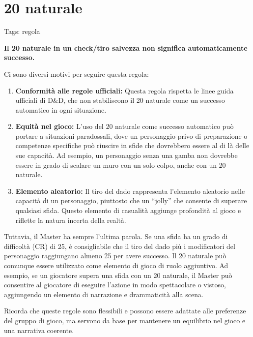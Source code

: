 \section{20 naturale}\label{naturale}

Tags: regola

\textbf{Il 20 naturale in un check/tiro salvezza non significa
automaticamente successo.}

Ci sono diversi motivi per seguire questa regola:

\begin{enumerate}
\def\labelenumi{\arabic{enumi}.}
\tightlist
\item
  \textbf{Conformità alle regole ufficiali:} Questa regola rispetta le
  linee guida ufficiali di D\&D, che non stabiliscono il 20 naturale
  come un successo automatico in ogni situazione.
\item
  \textbf{Equità nel gioco:} L'uso del 20 naturale come successo
  automatico può portare a situazioni paradossali, dove un personaggio
  privo di preparazione o competenze specifiche può riuscire in sfide
  che dovrebbero essere al di là delle sue capacità. Ad esempio, un
  personaggio senza una gamba non dovrebbe essere in grado di scalare un
  muro con un solo colpo, anche con un 20 naturale.
\item
  \textbf{Elemento aleatorio:} Il tiro del dado rappresenta l'elemento
  aleatorio nelle capacità di un personaggio, piuttosto che un ``jolly''
  che consente di superare qualsiasi sfida. Questo elemento di casualità
  aggiunge profondità al gioco e riflette la natura incerta della
  realtà.
\end{enumerate}

Tuttavia, il Master ha sempre l'ultima parola. Se una sfida ha un grado
di difficoltà (CR) di 25, è consigliabile che il tiro del dado più i
modificatori del personaggio raggiungano almeno 25 per avere successo.
Il 20 naturale può comunque essere utilizzato come elemento di gioco di
ruolo aggiuntivo. Ad esempio, se un giocatore supera una sfida con un 20
naturale, il Master può consentire al giocatore di eseguire l'azione in
modo spettacolare o vistoso, aggiungendo un elemento di narrazione e
drammaticità alla scena.

Ricorda che queste regole sono flessibili e possono essere adattate alle
preferenze del gruppo di gioco, ma servono da base per mantenere un
equilibrio nel gioco e una narrativa coerente.
